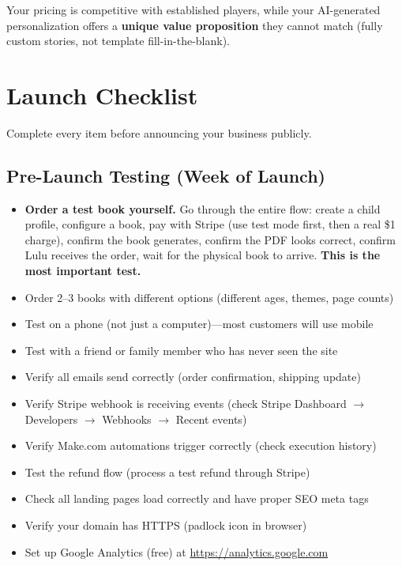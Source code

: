 \documentclass[12pt, letterpaper, oneside]{book}
\begin{document}
\noindent Your pricing is competitive with established players, while your AI-generated personalization offers a \textbf{unique value proposition} they cannot match (fully custom stories, not template fill-in-the-blank).


\chapter{Launch Checklist}

Complete every item before announcing your business publicly.

\section{Pre-Launch Testing (Week of Launch)}

\begin{itemize}[leftmargin=2em, itemsep=4pt]
  \item[$\square$] \textbf{Order a test book yourself.} Go through the entire flow: create a child profile, configure a book, pay with Stripe (use test mode first, then a real \$1 charge), confirm the book generates, confirm the PDF looks correct, confirm Lulu receives the order, wait for the physical book to arrive. \textbf{This is the most important test.}
  \item[$\square$] Order 2--3 books with different options (different ages, themes, page counts)
  \item[$\square$] Test on a phone (not just a computer)---most customers will use mobile
  \item[$\square$] Test with a friend or family member who has never seen the site
  \item[$\square$] Verify all emails send correctly (order confirmation, shipping update)
  \item[$\square$] Verify Stripe webhook is receiving events (check Stripe Dashboard $\rightarrow$ Developers $\rightarrow$ Webhooks $\rightarrow$ Recent events)
  \item[$\square$] Verify Make.com automations trigger correctly (check execution history)
  \item[$\square$] Test the refund flow (process a test refund through Stripe)
  \item[$\square$] Check all landing pages load correctly and have proper SEO meta tags
  \item[$\square$] Verify your domain has HTTPS (padlock icon in browser)
  \item[$\square$] Set up Google Analytics (free) at \url{https://analytics.google.com}
\end{itemize}
\end{document}
